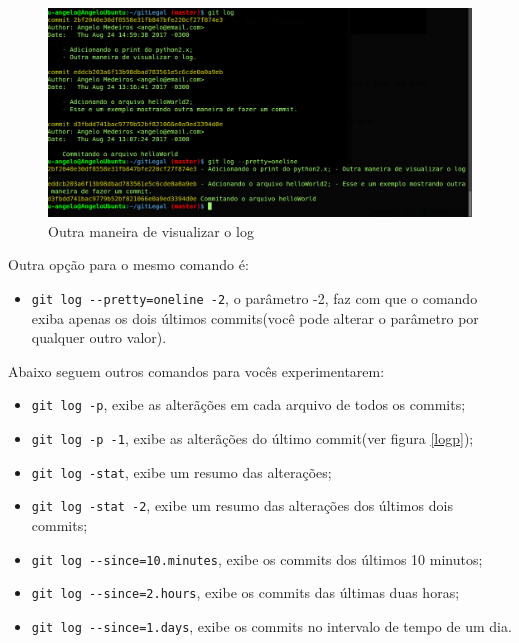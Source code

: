 \documentclass[12pt,openright,oneside,a4paper,english,brazil]{abntex2}
\begin{document}
\begin{figure}[h]
	\caption{\label{pretty}Outra maneira de visualizar o log}
	\begin{center}
		\includegraphics[width=1\linewidth]{pretty}
	\end{center}
\end{figure}

Outra opção para o mesmo comando é:

\begin{itemize}
	\item \verb|git log --pretty=oneline -2|, o parâmetro -2, faz com que o comando exiba apenas os dois últimos commits(você pode alterar o parâmetro por qualquer outro valor).
\end{itemize}

Abaixo seguem outros comandos para vocês experimentarem:

\begin{itemize}
	\item \verb|git log -p|, exibe as alterãções em cada arquivo de todos os commits;
	\item \verb|git log -p -1|, exibe as alterãções do último commit(ver figura \ref{logp});
	\item \verb|git log -stat|, exibe um resumo das alterações;
	\item \verb|git log -stat -2|, exibe um resumo das alterações dos últimos dois commits;
	\item \verb|git log --since=10.minutes|, exibe os commits dos últimos 10 minutos;
	\item \verb|git log --since=2.hours|, exibe os commits das últimas duas horas;
	\item \verb|git log --since=1.days|, exibe os commits no intervalo de tempo de um dia.
\end{itemize}
\end{document}
